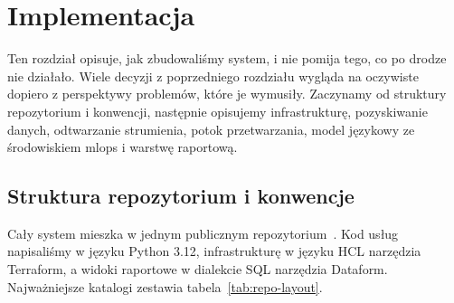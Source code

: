 \chapter{Implementacja}
\label{chap:implementation}


Ten rozdział opisuje, jak zbudowaliśmy system, i nie pomija tego, co po drodze nie działało.
Wiele decyzji z poprzedniego rozdziału wygląda na oczywiste dopiero z perspektywy problemów, które je wymusiły.
Zaczynamy od struktury repozytorium i konwencji, następnie opisujemy infrastrukturę, pozyskiwanie danych, odtwarzanie strumienia, potok przetwarzania, model językowy ze środowiskiem \ac{mlops} i warstwę raportową.

\section{Struktura repozytorium i konwencje}
\label{sec:impl-repository}

Cały system mieszka w jednym publicznym repozytorium~\cite{popvibecheck}.
Kod usług napisaliśmy w języku Python 3.12, infrastrukturę w języku HCL narzędzia Terraform, a widoki raportowe w dialekcie SQL narzędzia Dataform.
Najważniejsze katalogi zestawia tabela~\ref{tab:repo-layout}.

